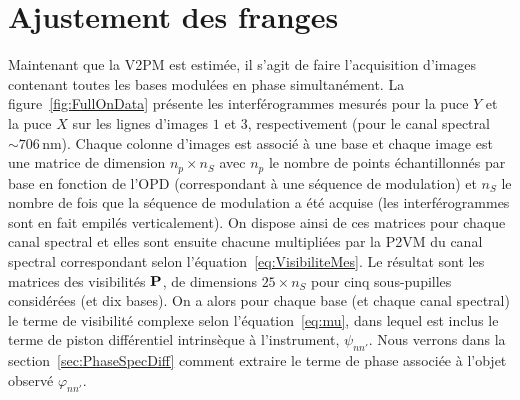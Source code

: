 

\section{Ajustement des franges}

Maintenant que la \ac{V2PM} est estimée, il s'agit de faire l'acquisition d'images contenant toutes les bases modulées en phase simultanément. La figure~\ref{fig:FullOnData} présente les interférogrammes mesurés pour la puce $Y$ et la puce $X$ sur les lignes d'images $1$ et $3$, respectivement (pour le canal spectral $\sim 706 \,$nm). Chaque colonne d'images est associé à une base et chaque image est une matrice de dimension $n_p \times n_S$ avec $n_p$ le nombre de points échantillonnés par base en fonction de l'\ac{OPD} (correspondant à une séquence de modulation) et $n_S$ le nombre de fois que la séquence de modulation a été acquise (les interférogrammes sont en fait empilés verticalement). On dispose ainsi de ces matrices pour chaque canal spectral et elles sont ensuite chacune multipliées par la \ac{P2VM} du canal spectral correspondant selon l'équation~\ref{eq:VisibiliteMes}. Le résultat sont les matrices des visibilités $\text{\textbf{P}}$, de dimensions $25 \times n_S$ pour cinq sous-pupilles considérées (et dix bases). On a alors pour chaque base (et chaque canal spectral) le terme de visibilité complexe selon l'équation~\ref{eq:mu}, dans lequel est inclus le terme de piston différentiel intrinsèque à l'instrument, $\psi_{nn'}$. Nous verrons dans la section~\ref{sec:PhaseSpecDiff} comment extraire le terme de phase associée à l'objet observé $\varphi_{nn'}$.


